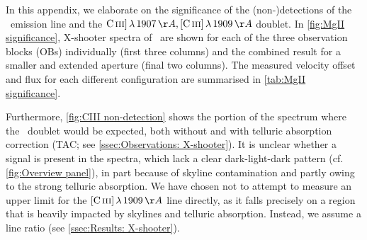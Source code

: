 In this appendix, we elaborate on the significance of the (non-)detections of the \MgII\ emission line and the $\CIIIs \, \lambda \, 1907 \, \Angstrom, \CIIIf \, \lambda \, 1909 \, \Angstrom$ doublet. In \cref{fig:MgII significance}, X-shooter spectra of \MgII\ are shown for each of the three observation blocks (OBs) individually (first three columns) and the combined result for a smaller and extended aperture (final two columns). The measured velocity offset and flux for each different configuration are summarised in \cref{tab:MgII significance}.

Furthermore, \cref{fig:CIII non-detection} shows the portion of the spectrum where the \CIII\ doublet would be expected, both without and with telluric absorption correction (TAC; see \cref{ssec:Observations: X-shooter}). It is unclear whether a signal is present in the spectra, which lack a clear dark-light-dark pattern (cf. \cref{fig:Overview panel}), in part because of skyline contamination and partly owing to the strong telluric absorption. We have chosen not to attempt to measure an upper limit for the $\CIIIf \, \lambda \, 1909 \, \Angstrom$ line directly, as it falls precisely on a region that is heavily impacted by skylines and telluric absorption. Instead, we assume a line ratio (see \cref{ssec:Results: X-shooter}).

